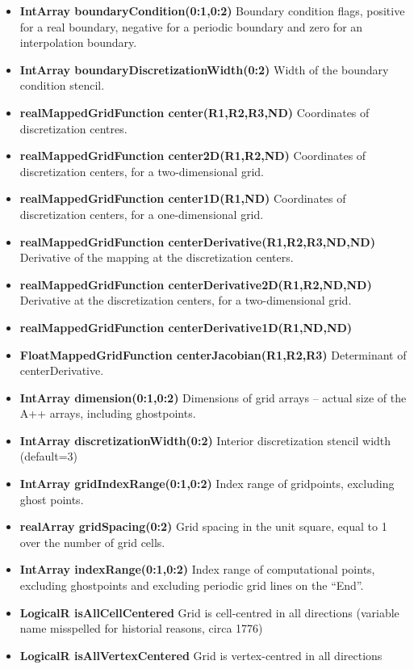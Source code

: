 \begin{itemize}
\item {\bf IntArray boundaryCondition(0:1,0:2)}  
       Boundary condition flags, positive for a real boundary, negative for a
       periodic boundary and zero for an interpolation boundary.
\item {\bf IntArray boundaryDiscretizationWidth(0:2)} 
       Width of the boundary condition stencil.  
\item {\bf realMappedGridFunction center(R1,R2,R3,ND)}
       Coordinates of discretization centres. 
\item {\bf realMappedGridFunction center2D(R1,R2,ND)}
         Coordinates of discretization centers, for a two-dimensional grid.  
\item {\bf realMappedGridFunction center1D(R1,ND)}
         Coordinates of discretization centers, for a one-dimensional grid.  
\item {\bf realMappedGridFunction centerDerivative(R1,R2,R3,ND,ND)}
        Derivative of the mapping at the discretization centers.
\item {\bf realMappedGridFunction centerDerivative2D(R1,R2,ND,ND)}
         Derivative at the discretization centers, for a two-dimensional grid.
\item {\bf realMappedGridFunction centerDerivative1D(R1,ND,ND)}
\item {\bf FloatMappedGridFunction centerJacobian(R1,R2,R3)} Determinant of centerDerivative.
\item {\bf IntArray   dimension(0:1,0:2)}   Dimensions of grid arrays -- actual size of the
      A++ arrays, including ghostpoints.
\item {\bf IntArray discretizationWidth(0:2)}   Interior discretization stencil width (default=3)
\item {\bf IntArray gridIndexRange(0:1,0:2)}   Index range of gridpoints, excluding ghost points.
\item {\bf realArray gridSpacing(0:2)} Grid spacing in the unit square, equal to 1 over the number of grid cells.
\item {\bf IntArray indexRange(0:1,0:2)}   
      Index range of computational points, excluding ghostpoints and excluding periodic
      grid lines on the ``End''.
\item {\bf LogicalR isAllCellCentered}   Grid is cell-centred in all directions
       (variable name misspelled for historial reasons, circa 1776)
\item {\bf LogicalR isAllVertexCentered}   Grid is vertex-centred in all directions

\end{itemize}
